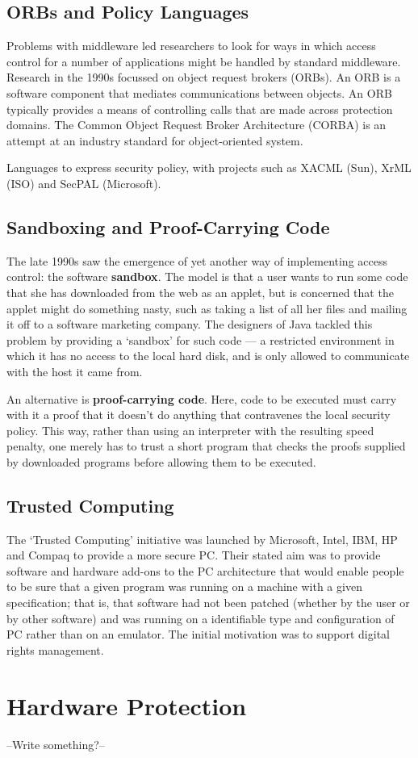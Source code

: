 		\subsection{ORBs and Policy Languages}
			Problems with middleware led researchers to look for ways in which access control 
			for a number of applications might be handled by standard middleware. Research
			in the 1990s focussed on object request brokers (ORBs). An ORB is a software
			component that mediates communications between objects.
			An ORB typically provides a means of controlling calls that are made across 
			protection domains. The Common Object Request Broker Architecture (CORBA) is an 
			attempt at an industry standard for object-oriented system.

			Languages to express security policy, with projects such as XACML (Sun), XrML 
			(ISO) and SecPAL (Microsoft).

		\subsection{Sandboxing and Proof-Carrying Code}
			The late 1990s saw the emergence of yet another way of implementing access
			control: the software {\bf sandbox}. 
			The model is that a user wants to run some code that she has downloaded 
			from the web as an applet, but is concerned that
			the applet might do something nasty, such as taking a list of all her files and
			mailing it off to a software marketing company.
			The designers of Java tackled this problem by providing a ‘sandbox’ for such
			code — a restricted environment in which it has no access to the local hard
			disk, and is only allowed to communicate with the host it came from.

			An alternative is {\bf proof-carrying code}. Here, code to be executed must carry
			with it a proof that it doesn’t do anything that contravenes the local security
			policy. This way, rather than using an interpreter with the resulting speed
			penalty, one merely has to trust a short program that checks the proofs
			supplied by downloaded programs before allowing them to be executed.

		\subsection{Trusted Computing}
			The ‘Trusted Computing’ initiative was launched by Microsoft, Intel, IBM, HP
			and Compaq to provide a more secure PC. Their stated aim was to provide
			software and hardware add-ons to the PC architecture that would enable
			people to be sure that a given program was running on a machine with a
			given specification; that is, that software had not been patched (whether by
			the user or by other software) and was running on a identifiable type and
			configuration of PC rather than on an emulator. The initial motivation was
			to support digital rights management.


	\clearpage
	\section{Hardware Protection}
		--Write something?--





